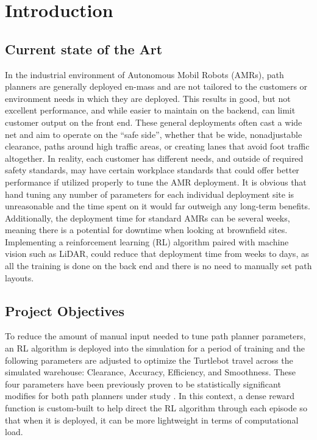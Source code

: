 \documentclass[conference]{IEEEtran}
\begin{document}
\section{Introduction}
    \subsection{Current state of the Art}
    In the industrial environment of Autonomous Mobil Robots (AMRs), path planners are generally deployed en-mass and are not tailored to the
    customers or environment needs in which they are deployed. This results in good, but not excellent performance, and while easier to maintain on
    the backend, can limit customer output on the front end. These general deployments often cast a wide net and aim to operate on the ``safe side'',
    whether that be wide, nonadjustable clearance, paths around high traffic areas, or creating lanes that avoid foot traffic altogether. In reality,
    each customer has different needs, and outside of required safety standards, may have certain workplace standards that could offer better
    performance if utilized properly to tune the AMR deployment. It is obvious that hand tuning any number of parameters for each individual
    deployment site is unreasonable and the time spent on it would far outweigh any long-term benefits. Additionally, the deployment time for
    standard AMRs can be several weeks, meaning there is a potential for downtime when looking at brownfield sites. Implementing a reinforcement
    learning (RL) algorithm paired with machine vision such as LiDAR, could reduce that deployment time from weeks to days, as all the training is
    done on the back end and there is no need to manually set path layouts.
    
    \subsection{Project Objectives}
    To reduce the amount of manual input needed to tune path planner parameters, an RL algorithm is deployed into the simulation for a period of
    training and the following parameters are adjusted to optimize the Turtlebot travel across the simulated warehouse: Clearance, Accuracy,
    Efficiency, and Smoothness. These four parameters have been previously proven to be statistically significant modifies for both path planners 
    under study \cite{b1} \cite{b2}. In this context, a dense reward function is custom-built to help direct the RL algorithm through each episode so
    that when it is deployed, it can be more lightweight in terms of computational load.
\end{document}
